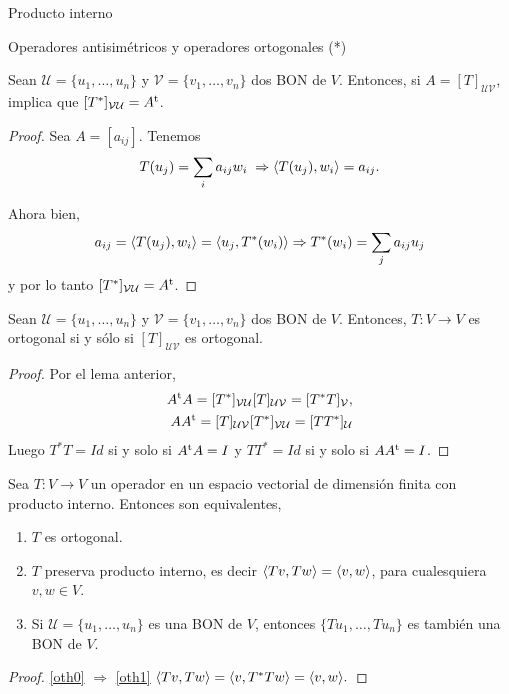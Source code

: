 \begin{chapter}{Producto interno}
\begin{section}{Operadores antisim\'etricos y operadores ortogonales (*)}
        \begin{lema}\label{lema-th-6.5}
            Sean $\mathcal U = \{u_1,\ldots,u_n\}$ y $\mathcal V = \{v_1,\ldots,v_n\}$ dos BON de $V$. Entonces, si $A=[T]_{\mathcal U \mathcal V}$, implica que $[T^*]_{\mathcal V \mathcal U} = A^{{\operatorname{t}}}$.
        \end{lema}
        \begin{proof} Sea $A = [a_{ij}]$. 
        Tenemos  
        $$T(u_j) = \sum_i a_{ij}w_i \; \Rightarrow\langle T(u_j),w_i \rangle = a_{ij}.$$ 
        
        Ahora bien, 
        $$a_{ij} = \langle T(u_j),w_i \rangle =\langle u_j,T^*(w_i) \rangle \Rightarrow  T^*(w_i) = \sum_j a_{ij} u_j$$ y por lo tanto  $[T^*]_{\mathcal V \mathcal U} = A^{{\operatorname{t}}}$. 
            
        \end{proof}
        
        \begin{teorema} \label{th-6.5}Sean $\mathcal U = \{u_1,\ldots,u_n\}$ y $\mathcal V = \{v_1,\ldots,v_n\}$ dos BON de $V$. Entonces, $T:V\to V$  es ortogonal si y sólo si $[T]_{\mathcal U \mathcal V}$ es ortogonal. 
        \end{teorema}
        \begin{proof}
            
            Por el lema anterior, 
            \begin{align*}
                    A^{{\operatorname{t}}}A = [T^*]_{\mathcal V \mathcal U} [T]_{\mathcal U \mathcal V} = [T^*T]_{\mathcal V},\\
                    AA^{{\operatorname{t}}} = [T]_{\mathcal U \mathcal V}[T^*]_{\mathcal V \mathcal U} = [TT^*]_{\mathcal U}
            \end{align*} 
            Luego $T^*T = Id$ si y solo si $A^{{\operatorname{t}}}A=I$ y  $TT^* = Id$ si y solo si $AA^{{\operatorname{t}}}=I$.
        \end{proof}
        
        \begin{teorema}\label{th-6.6}
            Sea $T:V \to V$ un operador en un espacio vectorial de dimensión finita con producto interno. Entonces son equivalentes,
            \begin{enumerate}
                \item\label{oth0} $T$  es ortogonal. 
                \item\label{oth1} $T$ preserva producto interno,  es decir $\langle Tv,Tw \rangle = \langle v,w \rangle $, para cualesquiera $v,w \in V$.
                \item\label{oth3} Si $\mathcal U =\{u_1,\ldots,u_n\}$ es una BON de $V$, entonces $\{Tu_1,\ldots,Tu_n\}$ es también una BON de $V$.
            \end{enumerate}
        \end{teorema}
        \begin{proof}
            \ref{oth0} $\Rightarrow$ \ref{oth1}
            $
            \langle Tv,Tw\rangle =	\langle v,T^*Tw\rangle  = \langle v,w \rangle .
            $
            

\end{proof}
\end{section}
\end{chapter}
